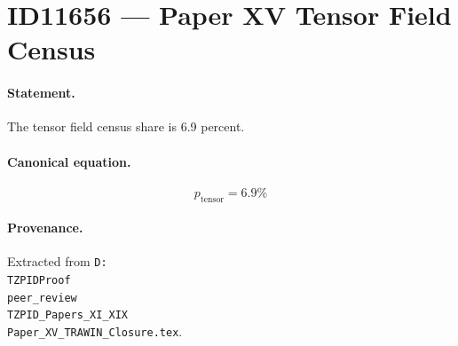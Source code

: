 \section*{ID11656 --- Paper XV Tensor Field Census}

\paragraph{Statement.}
The tensor field census share is 6.9 percent.

\paragraph{Canonical equation.}
\[
p_{\mathrm{tensor}}=6.9\%
\]

\paragraph{Provenance.}
Extracted from \texttt{D:\\TZPIDProof\\peer\_review\\TZPID\_Papers\_XI\_XIX\\Paper\_XV\_TRAWIN\_Closure.tex}.
